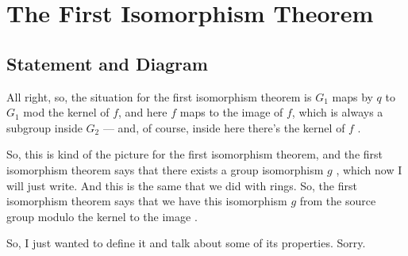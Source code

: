\section{The First Isomorphism Theorem}

\subsection{Statement and Diagram}

\begin{speech}[00:03:49 - 00:05:13]
All right, so, the situation for the first isomorphism theorem is $G_1$ maps by $q$ to $G_1$ mod the kernel of $f$, and here $f$ maps to the image of $f$, which is always a subgroup inside $G_2$ --- and, of course, inside here there's the kernel of $f$ .

So, this is kind of the picture for the first isomorphism theorem, and the first isomorphism theorem says that there exists a group isomorphism $g$ , which now I will just write. And this is the same that we did with rings. So, the first isomorphism theorem says that we have this isomorphism $g$ from the source group modulo the kernel to the image .

So, I just wanted to define it and talk about some of its properties. Sorry.
\end{speech}

